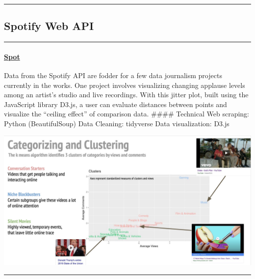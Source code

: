 \documentclass[
]{article}
\begin{document}
\begin{center}\rule{0.5\linewidth}{0.5pt}\end{center}

\hypertarget{spotify-web-api}{%
\subsection{Spotify Web API}\label{spotify-web-api}}

\begin{center}\rule{0.5\linewidth}{0.5pt}\end{center}

\begin{row}

\begin{col-sm-6}

\hypertarget{spot}{%
\paragraph{\texorpdfstring{\href{https://katjanewilson.github.io/WhartonAnalytics-MLB/}{Spot}}{Spot}}\label{spot}}

Data from the Spotify API are fodder for a few data journalism projects
currently in the works. One project involves visualizing changing
applause levels among an artist's studio and live recordings. With this
jitter plot, built using the JavaScript library D3.js, a user can
evaluate distances between points and visualize the ``ceiling effect''
of comparison data. \#\#\#\# Technical Web scraping: Python
(BeautifulSoup) Data Cleaning: tidyverse Data visualization: D3.js

\end{col-sm-6}

\begin{col-sm-6}

\includegraphics[width=800px]{images/image2}

\end{col-sm-6}

\end{row}

\begin{center}\rule{0.5\linewidth}{0.5pt}\end{center}
\end{document}
